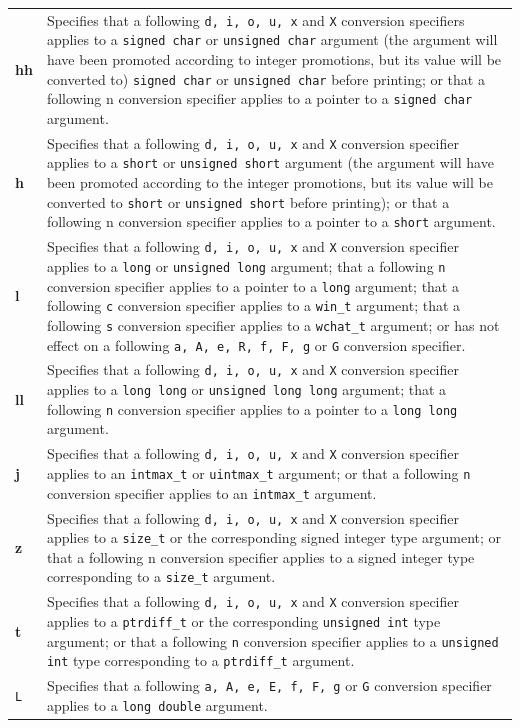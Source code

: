 \begin{longtable}{m{}m{}}
\textbf{hh}&Specifies that a following \texttt{d, i, o, u, x} and \texttt{X}
conversion specifiers applies to a \texttt{signed char} or \texttt{unsigned
  char} argument (the argument will have been promoted according to integer
promotions, but its value will be converted to) \texttt{signed char} or
\texttt{unsigned char} before printing; or that a following n conversion
specifier applies to a pointer to a \texttt{signed char} argument.\\
\textbf{h}&Specifies that a following \texttt{d, i, o, u, x} and \texttt{X}
conversion specifier applies to a \texttt{short} or \texttt{unsigned short}
argument (the argument will have been promoted according to the integer
promotions, but its value will be converted to \texttt{short} or
\texttt{unsigned short} before printing); or that a following n conversion
specifier applies to a pointer to a \texttt{short} argument.\\
\textbf{l}&Specifies that a following \texttt{d, i, o, u, x} and \texttt{X}
conversion specifier applies to a \texttt{long} or \texttt{unsigned long}
argument; that a following \texttt{n} conversion specifier applies to a pointer
to a \texttt{long} argument; that a following \texttt{c} conversion specifier
applies to a \texttt{win\_t} argument; that a following \texttt{s} conversion
specifier applies to a \texttt{wchat\_t} argument; or has not effect on a
following \texttt{a, A, e, R, f, F, g} or \texttt{G} conversion specifier.\\
\textbf{ll}&Specifies that a following \texttt{d, i, o, u, x} and \texttt{X}
conversion specifier applies to a \texttt{long long} or \texttt{unsigned long
  long} argument; that a following \texttt{n} conversion specifier applies to a
pointer to a \texttt{long long} argument.\\
\textbf{j}&Specifies that a following \texttt{d, i, o, u, x} and \texttt{X}
conversion specifier applies to an \texttt{intmax\_t} or \texttt{uintmax\_t}
argument; or that a following \texttt{n} conversion specifier applies to an
\texttt{intmax\_t} argument.\\
\textbf{z}&Specifies that a following \texttt{d, i, o, u, x} and \texttt{X}
conversion specifier applies to a \texttt{size\_t} or the corresponding signed
integer type argument; or that a following n conversion specifier applies to a
signed integer type corresponding to a \texttt{size\_t} argument.\\
\textbf{t}&Specifies that a following \texttt{d, i, o, u, x} and \texttt{X}
conversion specifier applies to a \texttt{ptrdiff\_t} or the corresponding
\texttt{unsigned int} type argument; or that a following \texttt{n} conversion
specifier applies to a \texttt{unsigned int} type corresponding to a
\texttt{ptrdiff\_t} argument.\\
\texttt{L}&Specifies that a following \texttt{a, A, e, E, f, F, g} or
\texttt{G} conversion specifier applies to a \texttt{long double} argument.
\end{longtable}

